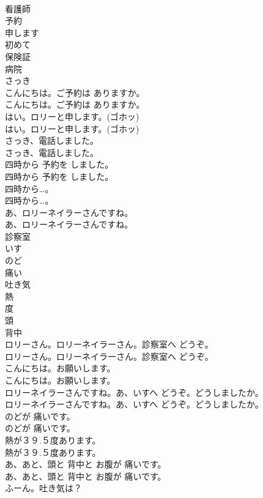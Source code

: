 \documentclass[8pt]{extreport}
\begin{document}
\begin{CJK}{UTF8}{min}
\\	看護師
\\	予約
\\	申します
\\	初めて
\\	保険証
\\	病院
\\	さっき
\\	こんにちは。ご予約は ありますか。	
\\	こんにちは。ご予約は ありますか。 
\\	はい。ロリーと申します。(ゴホッ)	
\\	はい。ロリーと申します。(ゴホッ)　 
\\	さっき、電話しました。	
\\	さっき、電話しました。 
\\	四時から 予約を しました。	
\\	四時から 予約を しました。 
\\	四時から…。	
\\	四時から…。 
\\	あ、ロリーネイラーさんですね。	
\\	あ、ロリーネイラーさんですね。 
\\	診察室
\\	いす
\\	のど
\\	痛い
\\	吐き気
\\	熱
\\	度
\\	頭
\\	背中
\\	ロリーさん。ロリーネイラーさん。診察室へ どうぞ。	
\\	ロリーさん。ロリーネイラーさん。診察室へ どうぞ。 
\\	こんにちは。お願いします。	
\\	こんにちは。お願いします。 
\\	ロリーネイラーさんですね。あ、いすへ どうぞ。どうしましたか。	
\\	ロリーネイラーさんですね。あ、いすへ どうぞ。どうしましたか。 
\\	のどが 痛いです。	
\\	のどが 痛いです。 
\\	熱が３９.５度あります。	
\\	熱が３９.５度あります。 
\\	あ、あと、頭と 背中と お腹が 痛いです。	
\\	あ、あと、頭と 背中と お腹が 痛いです。 
\\	ふーん。吐き気は？	

\end{CJK}
\end{document}
